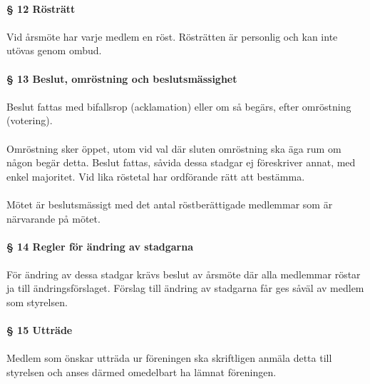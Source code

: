 \documentclass[12pt, a4paper]{article}
\begin{document}
\paragraph{§ 12 Rösträtt}
\paragraph{}
Vid årsmöte har varje medlem en röst. Rösträtten är personlig och kan inte utövas genom ombud.

\paragraph{§ 13 Beslut, omröstning och beslutsmässighet}
\paragraph{}
Beslut fattas med bifallsrop (acklamation) eller om så begärs, efter omröstning (votering).

\paragraph{}
Omröstning sker öppet, utom vid val där sluten omröstning ska äga rum om någon begär detta. Beslut fattas, såvida dessa stadgar ej föreskriver
annat, med enkel majoritet. Vid lika röstetal har ordförande rätt att bestämma.

\paragraph{}
Mötet är beslutsmässigt med det antal röstberättigade medlemmar som är närvarande på mötet.

\paragraph{§ 14 Regler för ändring av stadgarna}
\paragraph{}
För ändring av dessa stadgar krävs beslut av årsmöte där alla medlemmar röstar ja till ändringsförslaget. Förslag till ändring av stadgarna får ges såväl av medlem som styrelsen.

\paragraph{§ 15 Utträde}
\paragraph{}
Medlem som önskar utträda ur föreningen ska skriftligen anmäla detta till styrelsen och anses därmed omedelbart ha lämnat föreningen.
\end{document}
